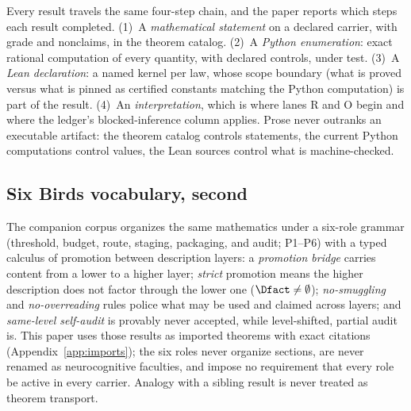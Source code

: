 Every result travels the same four-step chain, and the paper reports which
steps each result completed. (1)~A \emph{mathematical statement} on a declared
carrier, with grade and nonclaims, in the theorem catalog. (2)~A \emph{Python
enumeration}: exact rational computation of every quantity, with declared
controls, under test. (3)~A \emph{Lean declaration}: a named kernel per law,
whose scope boundary (what is proved versus what is pinned as certified
constants matching the Python computation) is part of the result.
(4)~An \emph{interpretation}, which is where lanes R and O begin and where the
ledger's blocked-inference column applies. Prose never outranks an executable
artifact: the theorem catalog controls statements, the current Python
computations control values, the Lean sources control what is machine-checked.

\subsection{Six Birds vocabulary, second}
\label{sec:sixbirds}

The companion corpus organizes the same mathematics under a six-role grammar
(threshold, budget, route, staging, packaging, and audit; P1--P6) with a typed
calculus of promotion between description layers: a \emph{promotion bridge}
carries content from a lower to a higher layer; \emph{strict} promotion means
the higher description does not factor through the lower one
($\Dfact\neq\emptyset$); \emph{no-smuggling} and \emph{no-overreading} rules
police what may be used and claimed across layers; and \emph{same-level
self-audit} is provably never accepted, while level-shifted, partial audit
is. This paper uses those results as imported theorems with exact citations
(Appendix~\ref{app:imports}); the six roles never organize sections, are never
renamed as neurocognitive faculties, and impose no requirement that every role
be active in every carrier. Analogy with a sibling result is never treated as
theorem transport.

